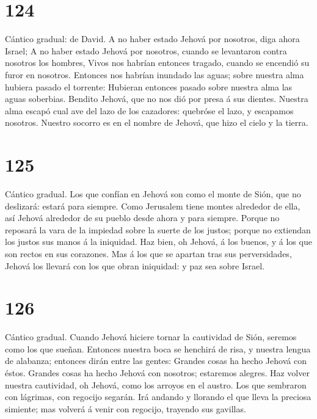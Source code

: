 \hypertarget{section-123}{%
\section{124}\label{section-123}}

 Cántico gradual: de David. A no haber estado Jehová por
nosotros, diga ahora Israel;  A no haber estado Jehová por
nosotros, cuando se levantaron contra nosotros los hombres,
 Vivos nos habrían entonces tragado, cuando se encendió su
furor en nosotros.  Entonces nos habrían inundado las
aguas; sobre nuestra alma hubiera pasado el torrente: 
Hubieran entonces pasado sobre nuestra alma las aguas soberbias.
 Bendito Jehová, que no nos dió por presa á sus dientes.
 Nuestra alma escapó cual ave del lazo de los cazadores:
quebróse el lazo, y escapamos nosotros.  Nuestro socorro
es en el nombre de Jehová, que hizo el cielo y la tierra.

\hypertarget{section-124}{%
\section{125}\label{section-124}}

 Cántico gradual. Los que confían en Jehová son como el
monte de Sión, que no deslizará: estará para siempre. 
Como Jerusalem tiene montes alrededor de ella, así Jehová alrededor de
su pueblo desde ahora y para siempre.  Porque no reposará
la vara de la impiedad sobre la suerte de los justos; porque no
extiendan los justos sus manos á la iniquidad.  Haz bien,
oh Jehová, á los buenos, y á los que son rectos en sus corazones.
 Mas á los que se apartan tras sus perversidades, Jehová
los llevará con los que obran iniquidad: y paz sea sobre Israel.

\hypertarget{section-125}{%
\section{126}\label{section-125}}

 Cántico gradual. Cuando Jehová hiciere tornar la
cautividad de Sión, seremos como los que sueñan.  Entonces
nuestra boca se henchirá de risa, y nuestra lengua de alabanza; entonces
dirán entre las gentes: Grandes cosas ha hecho Jehová con éstos.
 Grandes cosas ha hecho Jehová con nosotros; estaremos
alegres.  Haz volver nuestra cautividad, oh Jehová, como
los arroyos en el austro.  Los que sembraron con lágrimas,
con regocijo segarán.  Irá andando y llorando el que lleva
la preciosa simiente; mas volverá á venir con regocijo, trayendo sus
gavillas.

